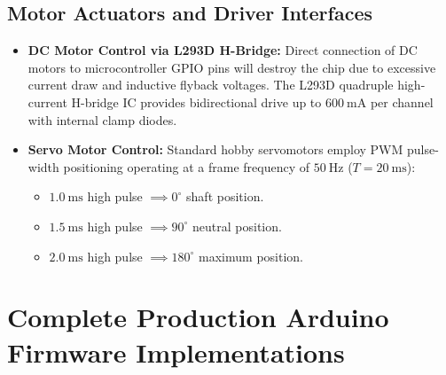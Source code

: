 \subsection{Motor Actuators and Driver Interfaces}
\begin{itemize}
    \item \textbf{DC Motor Control via L293D H-Bridge:} Direct connection of DC motors to microcontroller GPIO pins will destroy the chip due to excessive current draw and inductive flyback voltages. The L293D quadruple high-current H-bridge IC provides bidirectional drive up to $\SI{600}{\milli\ampere}$ per channel with internal clamp diodes.
    \item \textbf{Servo Motor Control:} Standard hobby servomotors employ PWM pulse-width positioning operating at a frame frequency of $\SI{50}{\hertz}$ ($T = \SI{20}{\milli\second}$):
    \begin{itemize}
        \item $\SI{1.0}{\milli\second}$ high pulse $\implies 0^\circ$ shaft position.
        \item $\SI{1.5}{\milli\second}$ high pulse $\implies 90^\circ$ neutral position.
        \item $\SI{2.0}{\milli\second}$ high pulse $\implies 180^\circ$ maximum position.
    \end{itemize}
\end{itemize}

\section{Complete Production Arduino Firmware Implementations}

